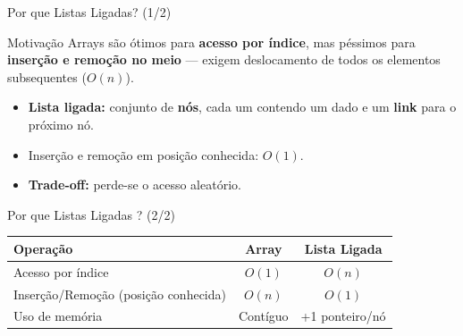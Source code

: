 \documentclass[aspectratio=169]{beamer}
\begin{document}
\begin{frame}[shrink]{Por que Listas Ligadas? (1/2)}
    \begin{alertblock}{Motivação}
        Arrays são ótimos para \textbf{acesso por índice}, mas péssimos para \textbf{inserção e remoção no meio} --- exigem deslocamento de todos os elementos subsequentes ($O(n)$).
    \end{alertblock}

    \vspace{0.3cm}
    \begin{itemize}
        \item \textbf{Lista ligada:} conjunto de \textbf{nós}, cada um contendo um dado e um \textbf{link} para o próximo nó.
        \item Inserção e remoção em posição conhecida: $O(1)$.
        \item \textbf{Trade-off:} perde-se o acesso aleatório.
    \end{itemize}
\end{frame}
\begin{frame}{Por que Listas Ligadas ? (2/2)}

    \centering
    \renewcommand{\arraystretch}{1.3}
    \begin{tabular}{lcc}
        \hline
        \textbf{Operação} & \textbf{Array} & \textbf{Lista Ligada} \\
        \hline
        Acesso por índice & $O(1)$ & $O(n)$ \\
        Inserção/Remoção (posição conhecida) & $O(n)$ & $O(1)$ \\
        Uso de memória & Contíguo & +1 ponteiro/nó \\
        \hline
    \end{tabular}
\end{frame}
\end{document}
